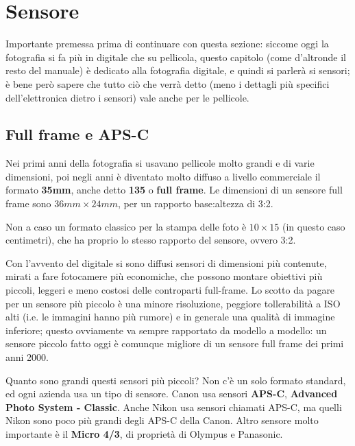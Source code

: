 \section{Sensore} \label{sec:sensore}
Importante premessa prima di continuare con questa sezione: siccome oggi la fotografia si fa più in digitale che su pellicola, questo capitolo (come d'altronde il resto del manuale) è dedicato alla fotografia digitale, e quindi si parlerà si sensori; è bene però sapere che tutto ciò che verrà detto (meno i dettagli più specifici dell'elettronica dietro i sensori) vale anche per le pellicole.


\subsection{Full frame e APS-C} \label{subsec:sensorifullaps}
Nei primi anni della fotografia si usavano pellicole molto grandi e di varie dimensioni, poi negli anni è diventato molto diffuso a livello commerciale il formato \textbf{35mm}, anche detto \textbf{135} o \textbf{full frame}.
Le dimensioni di un sensore full frame sono $36mm \times 24mm$, per un rapporto base:altezza di 3:2.

Non a caso un formato classico per la stampa delle foto è $10 \times 15$ (in questo caso centimetri), che ha proprio lo stesso rapporto del sensore, ovvero 3:2.

Con l'avvento del digitale si sono diffusi sensori di dimensioni più contenute, mirati a fare fotocamere più economiche, che possono montare obiettivi più piccoli, leggeri e meno costosi delle controparti full-frame.
Lo scotto da pagare per un sensore più piccolo è una minore risoluzione, peggiore tollerabilità a ISO alti (i.e. le immagini hanno più rumore) e in generale una qualità di immagine inferiore; questo ovviamente va sempre rapportato da modello a modello: un sensore piccolo fatto oggi è comunque migliore di un sensore full frame dei primi anni 2000.

Quanto sono grandi questi sensori più piccoli? Non c'è un solo formato standard, ed ogni azienda usa un tipo di sensore.\newline
Canon usa sensori \textbf{APS-C}, \textbf{Advanced Photo System - Classic}. Anche Nikon usa sensori chiamati APS-C, ma quelli Nikon sono poco più grandi degli APS-C della Canon. Altro sensore molto importante è il \textbf{Micro 4/3}, di proprietà di Olympus e Panasonic.

